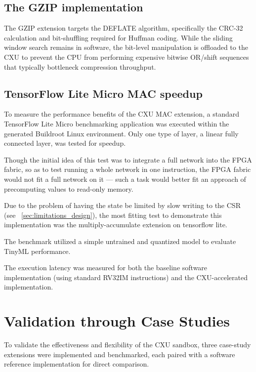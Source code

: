 \subsection{The GZIP implementation}
\label{subsec:gzip_impl}
The GZIP extension targets the DEFLATE algorithm, specifically the CRC-32 calculation
and bit-shuffling required for Huffman coding. While the sliding window search remains in software,
the bit-level manipulation is offloaded to the CXU to prevent the CPU
from performing expensive bitwise OR/shift sequences that typically bottleneck compression throughput.

\subsection{TensorFlow Lite Micro MAC speedup}
\label{subsec:tflite_impl}

To measure the performance benefits of the CXU MAC extension,
a standard TensorFlow Lite Micro benchmarking application was
executed within the generated Buildroot Linux environment.
Only one type of layer, a linear fully connected layer, was tested for speedup.

Though the initial idea of this test was to integrate a full
network into the FPGA fabric, so as to test running a whole network in
one instruction, the FPGA fabric would not fit a full network on it ---
such a task would better fit an approach of precomputing values to
read-only memory.

Due to the problem of having the state be limited by slow
writing to the CSR (see ~\autoref{sec:limitations_design}),
the most fitting test to demonstrate this implementation was the
multiply-accumulate extension on tensorflow lite.

The benchmark utilized a simple untrained
and quantized model to evaluate TinyML performance.

The execution latency was measured for both the baseline software implementation
(using standard RV32IM instructions) and the CXU-accelerated implementation.

\section{Validation through Case Studies}
\label{sec:case_studies}

To validate the effectiveness and flexibility of the CXU sandbox, three case-study
extensions were implemented and benchmarked, each paired with a software reference
implementation for direct comparison.

